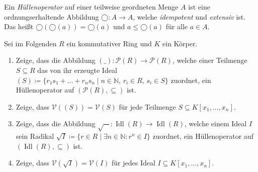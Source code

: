 \documentclass{uebungsblatt}
\DeclareMathOperator{\Idl}{Idl}
\begin{document}
\begin{exercise}[Hüllenoperatoren]
  Ein \emph{Hüllenoperator} auf einer teilweise geordneten Menge $A$ ist eine ordnungserhaltende Abbildung $◯:A → A$, welche \emph{idempotent} und \emph{extensiv} ist.
  Das heißt $◯(◯(a))=◯(a)$ und $a ≤ ◯(a)$ für alle $a ∈ A$.

  Sei im Folgenden $R$ ein kommutativer Ring und $K$ ein Körper.
  \begin{enumerate}
    \item Zeige, dass die Abbildung $(\_):𝒫(R) → 𝒫(R)$, welche einer Teilmenge $S⊆R$ das von ihr erzeugte Ideal $(S)\coloneqq \{r_1s_1 + \dots + r_ns_n \mid n ∈ ℕ,\, r_i ∈ R,\, s_i ∈ S\}$ zuordnet, ein Hüllenoperator auf $(𝒫(R),⊆)$ ist.
    \item Zeige, dass $𝒱((S))=𝒱(S)$ für jede Teilmenge $S⊆K[x_1,\dots,x_n]$.
    \item Zeige, dass die Abbildung $\sqrt{-}:\Idl(R) → \Idl(R)$, welche einem Ideal $I$ sein Radikal $\sqrt{I}\coloneqq\{r ∈ R \mid ∃n ∈ ℕ : r^n ∈ I\}$ zuordnet, ein Hüllenoperator auf $(\Idl(R),⊆)$ ist.
    \item Zeige, dass $𝒱(\sqrt{I})=𝒱(I)$ für jedes Ideal $I⊆K[x_1,\dots,x_n]$.
  \end{enumerate}
\end{exercise}
\end{document}
